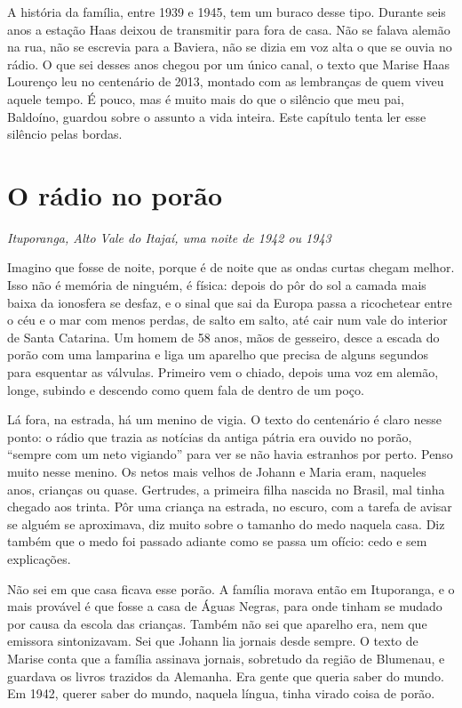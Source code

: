 \documentclass[
  brazilian,
  11pt,
  openany]{book}
\begin{document}
A história da família, entre 1939 e 1945, tem um buraco desse tipo.
Durante seis anos a estação Haas deixou de transmitir para fora de casa.
Não se falava alemão na rua, não se escrevia para a Baviera, não se
dizia em voz alta o que se ouvia no rádio. O que sei desses anos chegou
por um único canal, o texto que Marise Haas Lourenço leu no centenário
de 2013, montado com as lembranças de quem viveu aquele tempo. É pouco,
mas é muito mais do que o silêncio que meu pai, Baldoíno, guardou sobre
o assunto a vida inteira. Este capítulo tenta ler esse silêncio pelas
bordas.

\section{O rádio no porão}\label{o-ruxe1dio-no-poruxe3o}

\emph{Ituporanga, Alto Vale do Itajaí, uma noite de 1942 ou 1943}

Imagino que fosse de noite, porque é de noite que as ondas curtas chegam
melhor. Isso não é memória de ninguém, é física: depois do pôr do sol a
camada mais baixa da ionosfera se desfaz, e o sinal que sai da Europa
passa a ricochetear entre o céu e o mar com menos perdas, de salto em
salto, até cair num vale do interior de Santa Catarina. Um homem de 58
anos, mãos de gesseiro, desce a escada do porão com uma lamparina e liga
um aparelho que precisa de alguns segundos para esquentar as válvulas.
Primeiro vem o chiado, depois uma voz em alemão, longe, subindo e
descendo como quem fala de dentro de um poço.

Lá fora, na estrada, há um menino de vigia. O texto do centenário é
claro nesse ponto: o rádio que trazia as notícias da antiga pátria era
ouvido no porão, ``sempre com um neto vigiando'' para ver se não havia
estranhos por perto. Penso muito nesse menino. Os netos mais velhos de
Johann e Maria eram, naqueles anos, crianças ou quase. Gertrudes, a
primeira filha nascida no Brasil, mal tinha chegado aos trinta. Pôr uma
criança na estrada, no escuro, com a tarefa de avisar se alguém se
aproximava, diz muito sobre o tamanho do medo naquela casa. Diz também
que o medo foi passado adiante como se passa um ofício: cedo e sem
explicações.

Não sei em que casa ficava esse porão. A família morava então em
Ituporanga, e o mais provável é que fosse a casa de Águas Negras, para
onde tinham se mudado por causa da escola das crianças. Também não sei
que aparelho era, nem que emissora sintonizavam. Sei que Johann lia
jornais desde sempre. O texto de Marise conta que a família assinava
jornais, sobretudo da região de Blumenau, e guardava os livros trazidos
da Alemanha. Era gente que queria saber do mundo. Em 1942, querer saber
do mundo, naquela língua, tinha virado coisa de porão.
\end{document}
